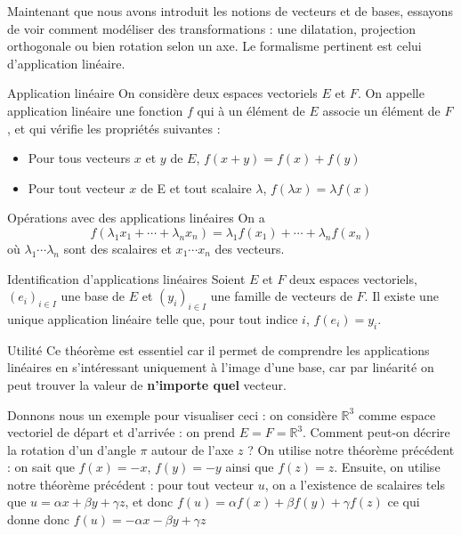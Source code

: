 \documentclass{classe}
\begin{document}
Maintenant que nous avons introduit les notions de vecteurs et de bases, essayons de voir comment modéliser des transformations : une dilatation, projection orthogonale ou bien rotation selon un axe. Le formalisme pertinent est celui d'application linéaire.

\begin{définition}{Application linéaire}{}
On considère deux espaces vectoriels $E$ et $F$. On appelle application linéaire une fonction $f$ qui à un élément de $E$ associe un élément de $F$, et qui vérifie les propriétés suivantes :
\begin{itemize}
	\item Pour tous vecteurs $x$ et $y$ de $E$, $f(x+y) = f(x)+f(y)$
	\item Pour tout vecteur $x$ de E et tout scalaire $\lambda$, $f(\lambda x) = \lambda f(x)$
\end{itemize}
\end{définition}

\begin{propositionfr}{Opérations avec des applications linéaires}{}
On a
$$f(\lambda_1 x_1 + \cdots + \lambda_n x_n) = \lambda_1 f(x_1) + \cdots + \lambda_n f(x_n)$$
où $\lambda_1 \cdots \lambda_n$ sont des scalaires et $x_1 \cdots x_n$ des vecteurs.
\end{propositionfr}

\begin{théorème}{Identification d'applications linéaires}{}
Soient $E$ et $F$ deux espaces vectoriels, $(e_i)_{i\in I}$ une base de $E$ et $(y_i)_{i\in I}$ une famille de vecteurs de $F$. Il existe une unique application linéaire telle que, pour tout indice $i$, $f(e_i) = y_i$.
\end{théorème}

\begin{remarque}{Utilité}{}
Ce théorème est essentiel car il permet de comprendre les applications linéaires en s'intéressant uniquement à l'image d'une base, car par linéarité on peut trouver la valeur de \textbf{n'importe quel} vecteur.
\end{remarque}

Donnons nous un exemple pour visualiser ceci : on considère $\mathbb{R}^3$ comme espace vectoriel de départ et d'arrivée : on prend $E = F = \mathbb{R}^3$. Comment peut-on décrire la rotation d'un d'angle $\pi$ autour de l'axe $z$ ? On utilise notre théorème précédent : on sait que $f(x) = -x$, $f(y) = -y$ ainsi que $f(z) = z$. Ensuite, on utilise notre théorème précédent : pour tout vecteur $u$, on a l'existence de scalaires tels que $u = \alpha x + \beta y + \gamma z$, et donc $f(u) = \alpha f(x) + \beta f(y) + \gamma f(z)$ ce qui donne donc $f(u) = -\alpha x - \beta y + \gamma z$
\end{document}
